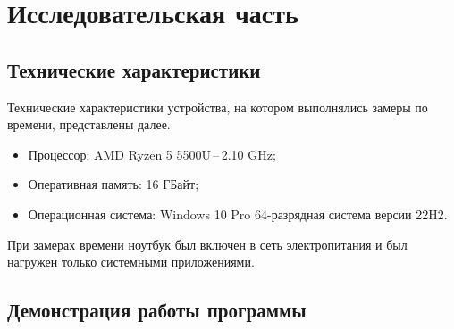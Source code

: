 \chapter{Исследовательская часть}

\section{Технические характеристики}

Технические характеристики устройства, на котором выполнялись замеры по времени, представлены далее.

\begin{itemize}
	\item Процессор: AMD Ryzen 5 5500U\,--\,2.10 GHz;
	\item Оперативная память: 16 ГБайт;
	\item Операционная система: Windows 10 Pro 64-разрядная система версии 22H2.
\end{itemize}

При замерах времени ноутбук был включен в сеть электропитания и был нагружен только системными приложениями.

\section{Демонстрация работы программы}

